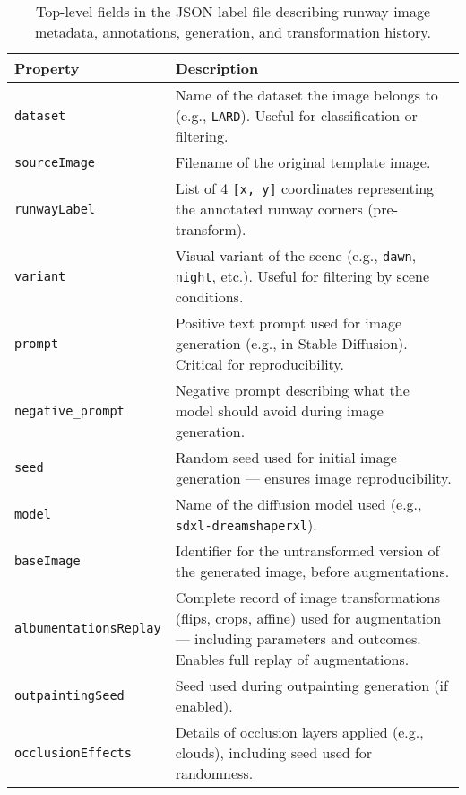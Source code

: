 \begin{table}[htbp]

\centering
\small
\renewcommand{\arraystretch}{1.3}
\begin{tabular}{|p{4cm}|p{9.5cm}|}
\hline
\textbf{Property} & \textbf{Description} \\
\hline
\texttt{dataset} & Name of the dataset the image belongs to (e.g., \texttt{LARD}). Useful for classification or filtering. \\
\hline
\texttt{sourceImage} & Filename of the original template image. \\
\hline
\texttt{runwayLabel} & List of 4 \texttt{[x, y]} coordinates representing the annotated runway corners (pre-transform). \\
\hline
\texttt{variant} & Visual variant of the scene (e.g., \texttt{dawn}, \texttt{night}, etc.). Useful for filtering by scene conditions. \\
\hline
\texttt{prompt} & Positive text prompt used for image generation (e.g., in Stable Diffusion). Critical for reproducibility. \\
\hline
\texttt{negative\_prompt} & Negative prompt describing what the model should avoid during image generation. \\
\hline
\texttt{seed} & Random seed used for initial image generation — ensures image reproducibility. \\
\hline
\texttt{model} & Name of the diffusion model used (e.g., \texttt{sdxl-dreamshaperxl}). \\
\hline
\texttt{baseImage} & Identifier for the untransformed version of the generated image, before augmentations. \\
\hline
\texttt{albumentationsReplay} & Complete record of image transformations (flips, crops, affine) used for augmentation — including parameters and outcomes. Enables full replay of augmentations. \\
\hline
\texttt{outpaintingSeed} & Seed used during outpainting generation (if enabled). \\
\hline
\texttt{occlusionEffects} & Details of occlusion layers applied (e.g., clouds), including seed used for randomness. \\
\hline
\end{tabular}
\caption{Top-level fields in the JSON label file describing runway image metadata, annotations, generation, and transformation history.}
\label{tab:json_fields_summary}
\end{table}


